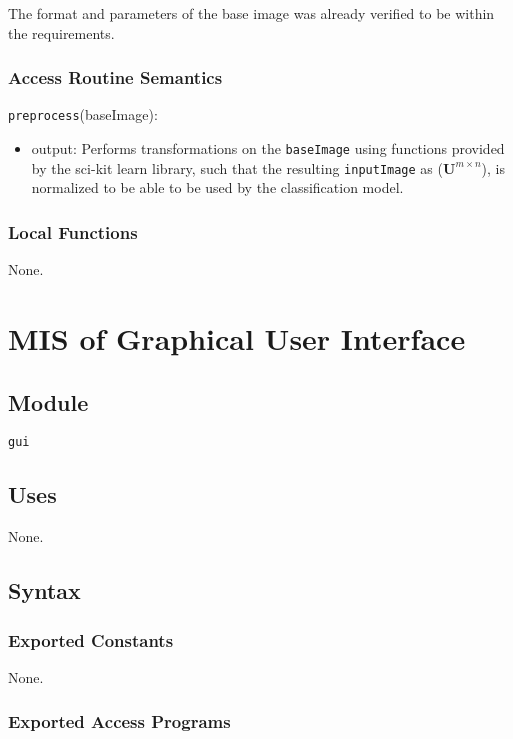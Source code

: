 \documentclass[12pt, titlepage]{article}
\def\code#1{\texttt{#1}}
\begin{document}
The format and parameters of the base image was already verified to be within the requirements.

\subsubsection{Access Routine Semantics}

\noindent \code{preprocess}(baseImage):
\begin{itemize} 
\item output: Performs transformations on the \code{baseImage} using functions provided by the 
sci-kit learn library, such that the resulting \code{inputImage} 
as ($\mathbf{U}^{m \times n}$), is normalized to be able to be used by the classification model.
\end{itemize}

\subsubsection{Local Functions}

None.

\section{MIS of Graphical User Interface} \label{ModuleGUI} 

\subsection{Module}

\code{gui}

\subsection{Uses}

None.

\subsection{Syntax}

\subsubsection{Exported Constants}

None.

\subsubsection{Exported Access Programs}
\end{document}
